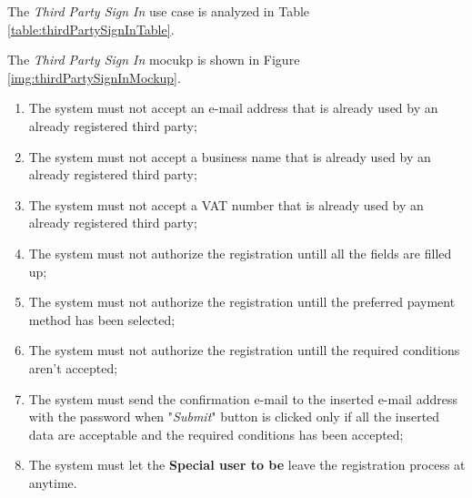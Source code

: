 The \textit{Third Party Sign In} use case is analyzed in Table \ref{table:thirdPartySignInTable}.

The \textit{Third Party Sign In} mocukp is shown in Figure \ref{img:thirdPartySignInMockup}.

\begin{enumerate}
  \item The system must not accept an e-mail address that is already used by an already registered third party;
  \item The system must not accept a business name that is already used by an already registered third party;
  \item The system must not accept a VAT number that is already used by an already registered third party;
  \item The system must not authorize the registration untill all the fields are filled up;
  \item The system must not authorize the registration untill the preferred payment method has been selected;
  \item The system must not authorize the registration untill the required conditions aren't accepted;
  \item The system must send the confirmation e-mail to the inserted e-mail address with the password when "\textit{Submit}" button is clicked only if all the inserted data are acceptable and the required conditions has been accepted;
  \item The system must let the \textbf{Special user to be} leave the registration process at anytime.
\end{enumerate}

